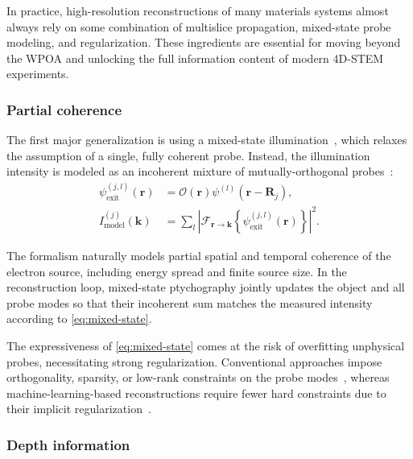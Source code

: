 \documentclass[pdflatex,sn-aps,iicol]{sn-jnl}%
\begin{document}
In practice, high-resolution reconstructions of many materials systems almost always rely on some combination of multislice propagation, mixed-state probe modeling, and regularization.
These ingredients are essential for moving beyond the WPOA and unlocking the full information content of modern 4D-STEM experiments.

\subsubsection*{Partial coherence}

The first major generalization is using a mixed-state illumination~\cite{Thibault_2013,Chen_2020}, which relaxes the assumption of a single, fully coherent probe.
Instead, the illumination intensity is modeled as an incoherent mixture of mutually-orthogonal probes~\cite{Odstrcil_2016}:
\begin{align}
\psi_{\text{exit}}^{(j,l)}(\boldsymbol{r})
&=
\mathcal{O}(\boldsymbol{r})
\psi^{(l)}(\boldsymbol{r}-\boldsymbol{R}_j),\\
I_{\text{model}}^{(j)}(\boldsymbol{k})
&=
\sum_l
\left\lvert
\mathcal{F}_{\boldsymbol{r}\to\boldsymbol{k}}
\left\{
\psi_{\text{exit}}^{(j,l)}(\boldsymbol{r})
\right\}
\right\rvert^2.
\label{eq:mixed-state}
\end{align}

The formalism naturally models partial spatial and temporal coherence of the electron source, including energy spread and finite source size.
In the reconstruction loop, mixed-state ptychography jointly updates the object and all probe modes so that their incoherent sum matches the measured intensity according to \cref{eq:mixed-state}.

The expressiveness of \cref{eq:mixed-state} comes at the risk of overfitting unphysical probes, necessitating strong regularization.
Conventional approaches impose orthogonality, sparsity, or low-rank constraints on the probe modes~\cite{Odstrcil_2016,Varnavides_2023}, whereas machine-learning-based reconstructions require fewer hard constraints due to their implicit regularization~\cite{McCray_2025}.

\subsubsection*{Depth information}
\end{document}

